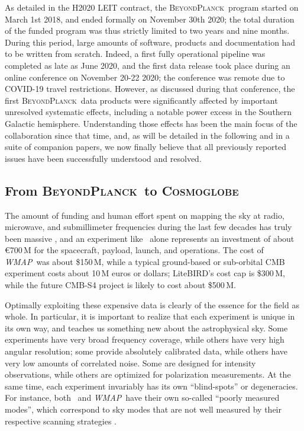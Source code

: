 \documentclass[twocolumn]{aa}
\def\WMAP{\emph{WMAP}}
\newcommand{\BP}{\textsc{BeyondPlanck}}
\begin{document}
As detailed in the H2020 LEIT contract, the \BP\ program started on
March 1st 2018, and ended formally on November 30th 2020; the total
duration of the funded program was thus strictly limited to two years
and nine months. During this period, large amounts of software,
products and documentation had to be written from scratch. Indeed, a
first fully operational pipeline was completed as late as June 2020,
and the first data release took place during an online conference on
November 20-22 2020; the conference was remote due to COVID-19 travel
restrictions. However, as discussed during that conference, the first
\BP\ data products were significantly affected by important unresolved
systematic effects, including a notable power excess in the Southern
Galactic hemisphere. Understanding those effects has been the main
focus of the collaboration since that time, and, as will be detailed
in the following and in a suite of companion papers, we now finally
believe that all previously reported issues have been successfully
understood and resolved.

\subsection{From \BP\ to \textsc{Cosmoglobe}}
\label{sec:cosmoglobe}

The amount of funding and human effort spent on mapping the sky at
radio, microwave, and submillimeter frequencies during the last few
decades has truly been massive \citep{bp05}, and an experiment like
\Planck\ alone represents an investment of about \euro 700\,M for the
spacecraft, payload, launch, and operations. The cost of \WMAP\ was
about \$150\,M, while a typical ground-based or sub-orbital CMB
experiment costs about 10\,M euros or dollars; LiteBIRD's cost cap is
\$300\,M, while the future CMB-S4 project is likely to cost about
\$500\,M.

Optimally exploiting these expensive data is clearly of the essence
for the field as whole. In particular, it is important to realize that
each experiment is unique in its own way, and teaches us something new
about the astrophysical sky. Some experiments have very broad
frequency coverage, while others have very high angular resolution;
some provide absolutely calibrated data, while others have very low
amounts of correlated noise. Some are designed for intensity
observations, while others are optimized for polarization
measurements. At the same time, each experiment invariably has its own
``blind-spots'' or degeneracies. For instance, both \Planck\ and
\WMAP\ have their own so-called ``poorly measured modes'', which
correspond to sky modes that are not well measured by their respective
scanning strategies \citep{planck2016-l01,bennett2012,bp17}.
\end{document}
